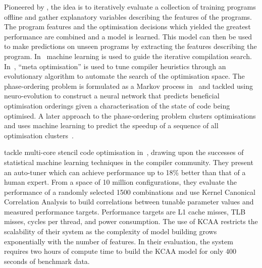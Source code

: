 Pioneered by \citeauthor{Agakov}, the idea is to iteratively evaluate a collection of training programs offline and gather explanatory variables describing the features of the programs. The program features and the optimisation decisions which yielded the greatest performance are combined and a model is learned. This model can then be used to make predictions on unseen programs by extracting the features describing the program. In~\cite{Agakov} machine learning is used to guide the iterative compilation search.
In~\cite{Stephenson2003}, ``meta optimisation'' is used to tune compiler heuristics through an evolutionary algorithm to automate the search of the optimisation space.
The phase-ordering problem is formulated as a Markov process in~\cite{Kulkarni2012} and tackled using neuro-evolution to construct a neural network that predicts beneficial optimisation orderings given a characterisation of the state of code being optimised.
A later approach to the phase-ordering problem clusters optimisations and uses machine learning to predict the speedup of a sequence of all optimisation clusters~\cite{Ashouri2017}.

\citeauthor{Ganapathi2009} tackle multi-core stencil code optimisation in~\cite{Ganapathi2009}, drawing upon the successes of statistical machine learning techniques in the compiler community. They present an auto-tuner which can achieve performance up to 18\% better than that of a human expert. From a space of 10 million configurations, they evaluate the performance of a randomly selected 1500 combinations and use Kernel Canonical Correlation Analysis to build correlations between tunable parameter values and measured performance targets. Performance targets are L1 cache misses, TLB misses, cycles per thread, and power consumption. The use of KCAA restricts the scalability of their system as the complexity of model building grows exponentially with the number of features. In their evaluation, the system requires two hours of compute time to build the KCAA model for only 400 seconds of benchmark data.

